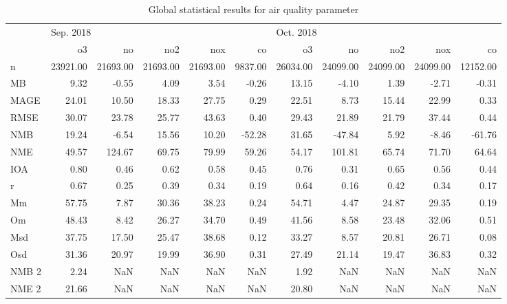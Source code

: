 \begin{table}
\centering
\caption{Global statistical results for air quality parameter}
\label{tab: gl_st}
\begin{tabular}{lrrrrrrrrrr}
\toprule
{} & \multicolumn{5}{l}{Sep. 2018} & \multicolumn{5}{l}{Oct. 2018} \\
{} &        o3 &        no &       no2 &       nox &       co &        o3 &        no &       no2 &       nox &        co \\
\midrule
n     &  23921.00 &  21693.00 &  21693.00 &  21693.00 &  9837.00 &  26034.00 &  24099.00 &  24099.00 &  24099.00 &  12152.00 \\
MB    &      9.32 &     -0.55 &      4.09 &      3.54 &    -0.26 &     13.15 &     -4.10 &      1.39 &     -2.71 &     -0.31 \\
MAGE  &     24.01 &     10.50 &     18.33 &     27.75 &     0.29 &     22.51 &      8.73 &     15.44 &     22.99 &      0.33 \\
RMSE  &     30.07 &     23.78 &     25.77 &     43.63 &     0.40 &     29.43 &     21.89 &     21.79 &     37.44 &      0.44 \\
NMB   &     19.24 &     -6.54 &     15.56 &     10.20 &   -52.28 &     31.65 &    -47.84 &      5.92 &     -8.46 &    -61.76 \\
NME   &     49.57 &    124.67 &     69.75 &     79.99 &    59.26 &     54.17 &    101.81 &     65.74 &     71.70 &     64.64 \\
IOA   &      0.80 &      0.46 &      0.62 &      0.58 &     0.45 &      0.76 &      0.31 &      0.65 &      0.56 &      0.44 \\
r     &      0.67 &      0.25 &      0.39 &      0.34 &     0.19 &      0.64 &      0.16 &      0.42 &      0.34 &      0.17 \\
Mm    &     57.75 &      7.87 &     30.36 &     38.23 &     0.24 &     54.71 &      4.47 &     24.87 &     29.35 &      0.19 \\
Om    &     48.43 &      8.42 &     26.27 &     34.70 &     0.49 &     41.56 &      8.58 &     23.48 &     32.06 &      0.51 \\
Msd   &     37.75 &     17.50 &     25.47 &     38.68 &     0.12 &     33.27 &      8.57 &     20.81 &     26.71 &      0.08 \\
Osd   &     31.36 &     20.97 &     19.99 &     36.90 &     0.31 &     27.49 &     21.14 &     19.47 &     36.83 &      0.32 \\
NMB 2 &      2.24 &       NaN &       NaN &       NaN &      NaN &      1.92 &       NaN &       NaN &       NaN &       NaN \\
NME 2 &     21.66 &       NaN &       NaN &       NaN &      NaN &     20.80 &       NaN &       NaN &       NaN &       NaN \\
\bottomrule
\end{tabular}
\end{table}

